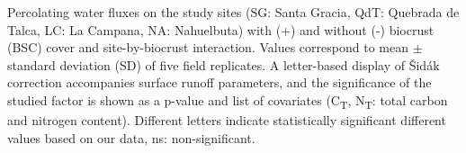 \begin{table}[htbp] %
  \centering
  \footnotesize %
  \begin{threeparttable}
    \caption[Percolating water fluxes on the study sites]{Percolating water fluxes on the study sites (SG: Santa Gracia, QdT: Quebrada de Talca, LC: La Campana, NA: Nahuelbuta) with (+) and without (-) biocrust (BSC) cover and site-by-biocrust interaction. Values correspond to mean $\pm$ standard deviation (SD) of five field replicates. A letter-based display of Šidák correction accompanies surface runoff parameters, and the significance of the studied factor is shown as a p-value and list of covariates (C\textsubscript{T}, N\textsubscript{T}: total carbon and nitrogen content). Different letters indicate statistically significant different values based on our data, ns: non-significant.}
    \label{tab:M2-percolation_fluxes}
    \setlength{\tabcolsep}{3pt} %


\end{threeparttable}
\end{table}
